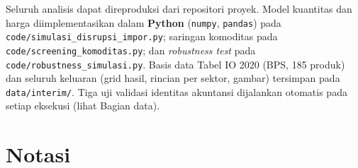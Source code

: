 \documentclass[
  manuscript=article,
  layout=publish,
  year=2026,
  volume=1,
]{den}
\begin{document}
Seluruh analisis dapat direproduksi dari repositori proyek. Model
kuantitas dan harga diimplementasikan dalam \textbf{Python}
(\texttt{numpy}, \texttt{pandas}) pada
\texttt{code/simulasi\_disrupsi\_impor.py}; saringan komoditas pada
\texttt{code/screening\_komoditas.py}; dan \emph{robustness test} pada
\texttt{code/robustness\_simulasi.py}. Basis data Tabel IO 2020 (BPS,
185 produk) dan seluruh keluaran (grid hasil, rincian per sektor,
gambar) tersimpan pada \texttt{data/interim/}. Tiga uji validasi
identitas akuntansi dijalankan otomatis pada setiap eksekusi (lihat
Bagian data).

\appendix

\section{Notasi}\label{notasi}
\end{document}
